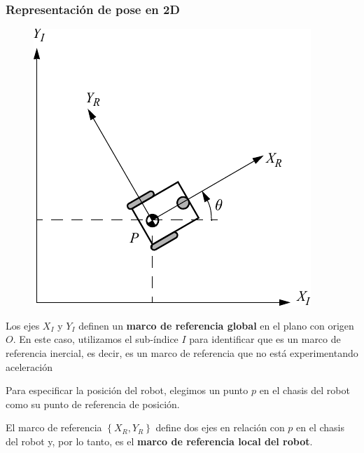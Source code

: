 \begin{frame}
    \frametitle{Representación de pose en 2D}
    \footnotesize

    \begin{figure}
        \includegraphics[width=0.2\columnwidth]{./images/coordinate_systems.pdf}
    \end{figure}



    Los ejes $X_I$ y $Y_I$ definen un \textbf{marco de referencia global} en el plano con origen $O$. En este caso, utilizamos el sub-índice $I$ para identificar que es un marco de referencia inercial, es decir, es un marco de referencia que no está experimentando aceleración 
    
    Para especificar la posición del robot, elegimos un punto $p$ en el chasis del robot como su punto de referencia de posición.
    
    El marco de referencia $\left\lbrace X_R,Y_R \right\rbrace$ define dos ejes en relación con $p$ en el chasis del robot y, por lo tanto, es el {\bf marco de referencia local del robot}.
    
\end{frame}


